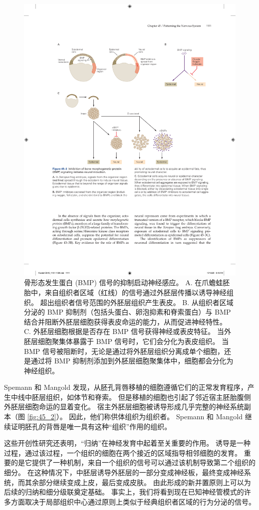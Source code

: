 \begin{figure}[htbp]
	\centering
	\includegraphics[width=0.9\linewidth]{chap45/fig_45_3}
	\caption{骨形态发生蛋白 (BMP) 信号的抑制启动神经感应。 A. 在爪蟾蛙胚胎中，来自组织者区域（红线）的信号通过外胚层传播以诱导神经组织。 超出组织者信号范围的外胚层组织产生表皮。 B. 从组织者区域分泌的 BMP 抑制剂（包括头蛋白、卵泡抑素和脊索蛋白）与 BMP 结合并阻断外胚层细胞获得表皮命运的能力，从而促进神经特性。 C. 外胚层细胞根据是否存在 BMP 信号获得神经或表皮特征。 当外胚层细胞聚集体暴露于 BMP 信号时，它们会分化为表皮组织。 当 BMP 信号被阻断时，无论是通过将外胚层组织分离成单个细胞，还是通过将 BMP 抑制剂添加到外胚层细胞聚集体中，细胞都会分化为神经组织。}
	\label{fig:45_3}
\end{figure}


Spemann 和 Mangold 发现，从胚孔背唇移植的细胞遵循它们的正常发育程序，产生中线中胚层组织，如体节和脊索。
但是移植的细胞也引起了邻近宿主胚胎腹侧外胚层细胞命运的显着变化。
宿主外胚层细胞被诱导形成几乎完整的神经系统副本（图 \ref{fig:45_2}）。
因此，他们称供体组织为组织者。
Spemann 和 Mangold 继续证明胚孔的背唇是唯一具有这种“组织”作用的组织。


这些开创性研究还表明，“归纳”在神经发育中起着至关重要的作用。
诱导是一种过程，通过该过程，一个组织的细胞在两个接近的区域指导相邻细胞的发育。
重要的是它提供了一种机制，来自一个组织的信号可以通过该机制导致第二个组织的细分。
在这种情况下，中胚层诱导外胚层的一部分变成神经板，最终变成神经系统，而其余部分继续变成上皮，最后变成皮肤。
由此形成的新并置原则上可以为后续的归纳和细分级联奠定基础。
事实上，我们将看到现在已知神经管模式的许多方面取决于局部组织中心通过原则上类似于经典组织者区域的行为分泌的信号。



